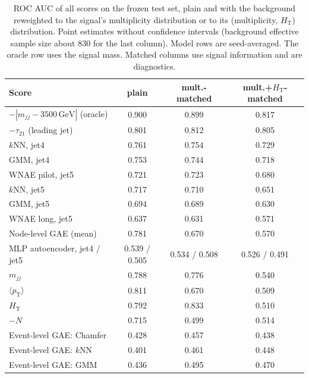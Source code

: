 \documentclass[11pt,a4paper]{article}
\newcommand{\pt}{\ensuremath{p_\mathrm{T}}\xspace}
\newcommand{\HT}{\ensuremath{H_\mathrm{T}}\xspace}
\newcommand{\mjj}{\ensuremath{m_{jj}}\xspace}
\newcommand{\tauTO}{\ensuremath{\tau_{21}}\xspace}
\newcommand{\ptmean}{\ensuremath{\langle \pt \rangle}\xspace}
\begin{document}
\begin{table}[t]
\centering
\caption{ROC AUC of all scores on the frozen test set, plain and with the background reweighted to the signal's
multiplicity distribution or to its (multiplicity, \HT) distribution. Point estimates without confidence
intervals (background effective sample size about $830$ for the last column). Model rows are
seed-averaged. The oracle row uses the signal mass. Matched columns use signal information and are
diagnostics.}
\label{tab:matchcmp}
\footnotesize\setlength{\tabcolsep}{4pt}
\begin{tabular}{lccc}
\toprule
Score & plain & mult.-matched & mult.+\HT-matched \\
\midrule
$-|\mjj-3500\,\mathrm{GeV}|$ (oracle) & 0.900 & 0.899 & 0.817 \\
$-\tauTO$ (leading jet)               & 0.801 & 0.812 & 0.805 \\
$k$NN, jet4                           & 0.761 & 0.754 & 0.729 \\
GMM, jet4                             & 0.753 & 0.744 & 0.718 \\
WNAE pilot, jet5                      & 0.721 & 0.723 & 0.680 \\
$k$NN, jet5                           & 0.717 & 0.710 & 0.651 \\
GMM, jet5                             & 0.694 & 0.689 & 0.630 \\
WNAE long, jet5                       & 0.637 & 0.631 & 0.571 \\
Node-level GAE (mean)                 & 0.781 & 0.670 & 0.570 \\
MLP autoencoder, jet4 / jet5          & 0.539 / 0.505 & 0.534 / 0.508 & 0.526 / 0.491 \\
\mjj                                  & 0.788 & 0.776 & 0.540 \\
\ptmean                               & 0.811 & 0.670 & 0.509 \\
\HT                                   & 0.792 & 0.833 & 0.510 \\
$-N$                                  & 0.715 & 0.499 & 0.514 \\
Event-level GAE: Chamfer              & 0.428 & 0.457 & 0.438 \\
Event-level GAE: $k$NN                & 0.401 & 0.461 & 0.448 \\
Event-level GAE: GMM                  & 0.436 & 0.495 & 0.470 \\
\bottomrule
\end{tabular}
\end{table}
\end{document}
